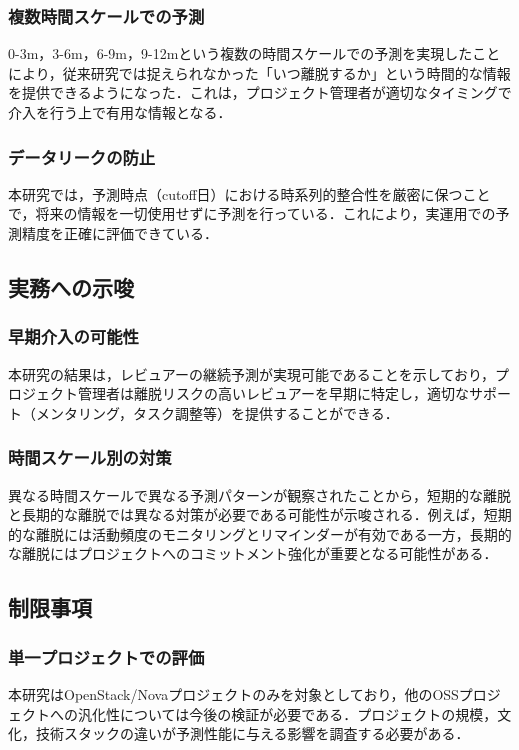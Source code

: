 \subsubsection{複数時間スケールでの予測}
0-3m，3-6m，6-9m，9-12mという複数の時間スケールでの予測を実現したことにより，従来研究では捉えられなかった「いつ離脱するか」という時間的な情報を提供できるようになった．これは，プロジェクト管理者が適切なタイミングで介入を行う上で有用な情報となる．

\subsubsection{データリークの防止}
本研究では，予測時点（cutoff日）における時系列的整合性を厳密に保つことで，将来の情報を一切使用せずに予測を行っている．これにより，実運用での予測精度を正確に評価できている．

\subsection{実務への示唆}

\subsubsection{早期介入の可能性}
本研究の結果は，レビュアーの継続予測が実現可能であることを示しており，プロジェクト管理者は離脱リスクの高いレビュアーを早期に特定し，適切なサポート（メンタリング，タスク調整等）を提供することができる．

\subsubsection{時間スケール別の対策}
異なる時間スケールで異なる予測パターンが観察されたことから，短期的な離脱と長期的な離脱では異なる対策が必要である可能性が示唆される．例えば，短期的な離脱には活動頻度のモニタリングとリマインダーが有効である一方，長期的な離脱にはプロジェクトへのコミットメント強化が重要となる可能性がある．

\subsection{制限事項}

\subsubsection{単一プロジェクトでの評価}
本研究はOpenStack/Novaプロジェクトのみを対象としており，他のOSSプロジェクトへの汎化性については今後の検証が必要である．プロジェクトの規模，文化，技術スタックの違いが予測性能に与える影響を調査する必要がある．

